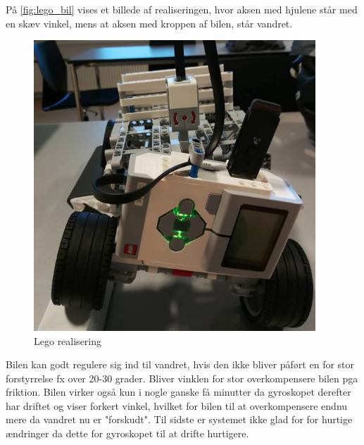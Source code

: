 På \autoref{fig:lego_bil} vises et billede af realiseringen, hvor aksen med hjulene står med en skæv vinkel, mens at aksen med kroppen af bilen, står vandret. 

\begin{figure}[H]
	\centering
	\includegraphics[width = 300pt]{figur/lego_bil}
	\caption{Lego realisering}
	\label{fig:lego_bil}
\end{figure}   

Bilen kan godt regulere sig ind til vandret, hvis den ikke bliver påført en for stor forstyrrelse fx over 20-30 grader. Bliver vinklen for stor overkompensere bilen pga friktion. Bilen virker også kun i nogle ganske få minutter da gyroskopet derefter har driftet og viser forkert vinkel, hvilket for bilen til at overkompensere endnu mere da vandret nu er "forskudt". Til sidste er systemet ikke glad for for hurtige ændringer da dette for gyroskopet til at drifte hurtigere.